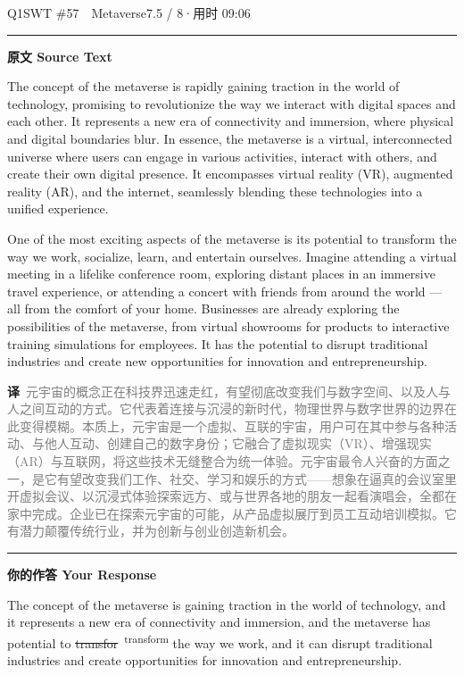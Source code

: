 \documentclass[11pt]{article}
\newcommand{\fix}[2]{%
  \colorbox{cWrongBg}{\textcolor{cWrong}{\sout{#1}}}%
  \,\textsuperscript{\textcolor{cFix}{\footnotesize #2}}}
\newcommand{\ptesub}[1]{%
  \par\needspace{2\baselineskip}\smallskip
  {\color{cAccent}\rule[-0.2ex]{3pt}{1.05em}}\hspace{6pt}%
  {\bfseries\color{cHead}#1}\par\nopagebreak\smallskip}
\newcommand{\zh}[1]{{\footnotesize\textcolor{cNote}{\textbf{译}}\ \textcolor{gray}{#1}}}
\begin{document}

\begin{qblock}{Q1\quad SWT \#57\ \ Metaverse}{7.5 / 8\quad·\quad 用时 09:06}

\ptesub{原文 Source Text}
\begin{promptbox}
The concept of the metaverse is rapidly gaining traction in the world of technology, promising to revolutionize the way we interact with digital spaces and each other. It represents a new era of connectivity and immersion, where physical and digital boundaries blur. In essence, the metaverse is a virtual, interconnected universe where users can engage in various activities, interact with others, and create their own digital presence. It encompasses virtual reality (VR), augmented reality (AR), and the internet, seamlessly blending these technologies into a unified experience.

One of the most exciting aspects of the metaverse is its potential to transform the way we work, socialize, learn, and entertain ourselves. Imagine attending a virtual meeting in a lifelike conference room, exploring distant places in an immersive travel experience, or attending a concert with friends from around the world --- all from the comfort of your home. Businesses are already exploring the possibilities of the metaverse, from virtual showrooms for products to interactive training simulations for employees. It has the potential to disrupt traditional industries and create new opportunities for innovation and entrepreneurship.
\end{promptbox}
\zh{元宇宙的概念正在科技界迅速走红，有望彻底改变我们与数字空间、以及人与人之间互动的方式。它代表着连接与沉浸的新时代，物理世界与数字世界的边界在此变得模糊。本质上，元宇宙是一个虚拟、互联的宇宙，用户可在其中参与各种活动、与他人互动、创建自己的数字身份；它融合了虚拟现实（VR）、增强现实（AR）与互联网，将这些技术无缝整合为统一体验。元宇宙最令人兴奋的方面之一，是它有望改变我们工作、社交、学习和娱乐的方式——想象在逼真的会议室里开虚拟会议、以沉浸式体验探索远方、或与世界各地的朋友一起看演唱会，全都在家中完成。企业已在探索元宇宙的可能，从产品虚拟展厅到员工互动培训模拟。它有潜力颠覆传统行业，并为创新与创业创造新机会。}

\ptesub{你的作答 Your Response}
\begin{youbox}
The concept of the metaverse is gaining traction in the world of technology, and it represents a new era of connectivity and immersion, and the metaverse has potential to \fix{transfor}{transform} the way we work, and it can disrupt traditional industries and create opportunities for innovation and entrepreneurship.
\end{youbox}


\end{qblock}
\end{document}
